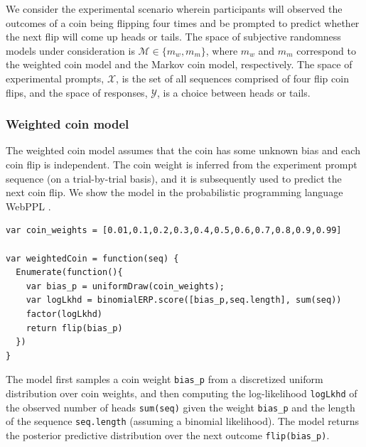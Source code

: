 \documentclass{article}
\newcommand{\red}[1]{\textcolor{Red}{#1}}
\begin{document}



We consider the experimental scenario wherein participants will observed the outcomes of a coin being flipping four times and be prompted to predict whether the next flip will come up heads or tails. The space of subjective randomness models under consideration is $\mathcal{M} \in \{m_w, m_m\}$, where $m_w$ and $m_m$ correspond to the weighted coin model and the Markov coin model, respectively. 
The space of experimental prompts, $\mathcal{X}$, is the set of all sequences comprised of four flip coin flips, and the space of responses, $\mathcal{Y}$, is a choice between heads or tails.

\subsubsection{Weighted coin model}
\label{s:tutorial:sss:biased}

The weighted coin model assumes that the coin has some unknown bias and each coin flip is independent. 
The coin weight is inferred from the experiment prompt sequence (on a trial-by-trial basis), and it is subsequently used to predict the next coin flip. We show the model in the probabilistic programming language WebPPL \cite{dippl}.
%
\begin{lstlisting}[caption=Biased coin model]
var coin_weights = [0.01,0.1,0.2,0.3,0.4,0.5,0.6,0.7,0.8,0.9,0.99]

var weightedCoin = function(seq) {
  Enumerate(function(){
    var bias_p = uniformDraw(coin_weights);
    var logLkhd = binomialERP.score([bias_p,seq.length], sum(seq))
    factor(logLkhd)
    return flip(bias_p)
  })
}
\end{lstlisting}
%
The model first samples a coin weight \lstinline{bias_p} from a discretized uniform distribution over coin weights, and then computing the log-likelihood \lstinline{logLkhd} of the observed number of heads \lstinline{sum(seq)} given the weight \lstinline{bias_p} and the length of the sequence \lstinline{seq.length} (assuming a binomial likelihood). The model returns the posterior predictive distribution over the next outcome \lstinline{flip(bias_p)}.
\end{document}
